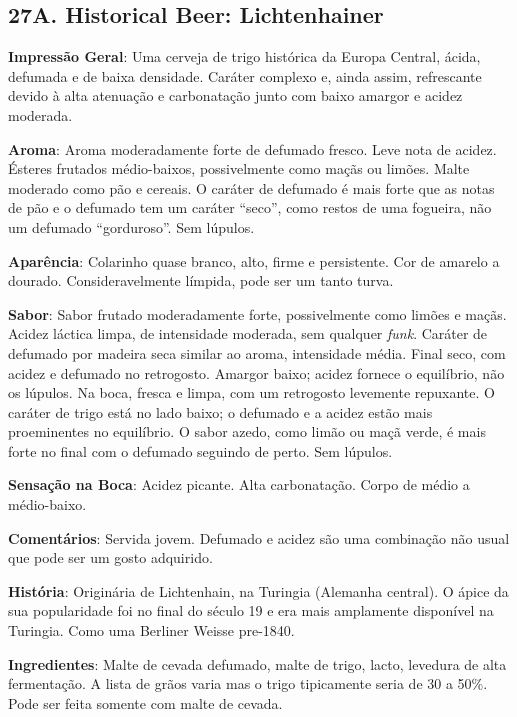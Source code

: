 \subsection*{27A. Historical Beer: Lichtenhainer}
\textbf{Impressão Geral}: Uma cerveja de trigo histórica da Europa Central, ácida, defumada e de baixa densidade. Caráter complexo e, ainda assim, refrescante devido à alta atenuação e carbonatação junto com baixo amargor e acidez moderada.

\textbf{Aroma}: Aroma moderadamente forte de defumado fresco. Leve nota de acidez. Ésteres frutados médio-baixos, possivelmente como maçãs ou limões. Malte moderado como pão e cereais. O caráter de defumado é mais forte que as notas de pão e o defumado tem um caráter “seco”, como restos de uma fogueira, não um defumado “gorduroso”. Sem lúpulos.

\textbf{Aparência}: Colarinho quase branco, alto, firme e persistente. Cor de amarelo a dourado. Consideravelmente límpida, pode ser um tanto turva.

\textbf{Sabor}: Sabor frutado moderadamente forte, possivelmente como limões e maçãs. Acidez láctica limpa, de intensidade moderada, sem qualquer \textit{funk}. Caráter de defumado por madeira seca similar ao aroma, intensidade média. Final seco, com acidez e defumado no retrogosto. Amargor baixo; acidez fornece o equilíbrio, não os lúpulos. Na boca, fresca e limpa, com um retrogosto levemente repuxante. O caráter de trigo está no lado baixo; o defumado e a acidez estão mais proeminentes no equilíbrio. O sabor azedo, como limão ou maçã verde, é mais forte no final com o defumado seguindo de perto. Sem lúpulos.

\textbf{Sensação na Boca}: Acidez picante. Alta carbonatação. Corpo de médio a médio-baixo.

\textbf{Comentários}: Servida jovem. Defumado e acidez são uma combinação não usual que pode ser um gosto adquirido.

\textbf{História}: Originária de Lichtenhain, na Turingia (Alemanha central). O ápice da sua popularidade foi no final do século 19 e era mais amplamente disponível na Turingia. Como uma Berliner Weisse pre-1840.

\textbf{Ingredientes}: Malte de cevada defumado, malte de trigo, lacto, levedura de alta fermentação. A lista de grãos varia mas o trigo tipicamente seria de 30 a 50\%. Pode ser feita somente com malte de cevada.

